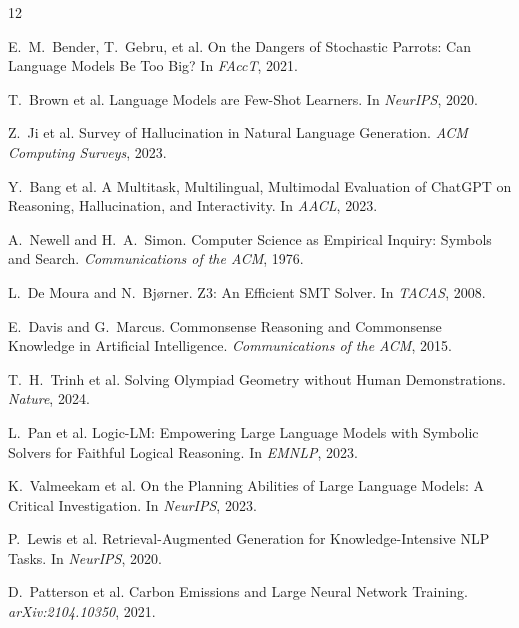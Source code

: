 \documentclass[11pt,a4paper]{article}
\begin{document}
\begin{thebibliography}{12}

E.~M.~Bender, T.~Gebru, et al.
\newblock On the Dangers of Stochastic Parrots: Can Language Models Be Too Big?
\newblock In \emph{FAccT}, 2021.

T.~Brown et al.
\newblock Language Models are Few-Shot Learners.
\newblock In \emph{NeurIPS}, 2020.

Z.~Ji et al.
\newblock Survey of Hallucination in Natural Language Generation.
\newblock \emph{ACM Computing Surveys}, 2023.

Y.~Bang et al.
\newblock A Multitask, Multilingual, Multimodal Evaluation of ChatGPT on Reasoning, Hallucination, and Interactivity.
\newblock In \emph{AACL}, 2023.

A.~Newell and H.~A.~Simon.
\newblock Computer Science as Empirical Inquiry: Symbols and Search.
\newblock \emph{Communications of the ACM}, 1976.

L.~De Moura and N.~Bj{\o}rner.
\newblock Z3: An Efficient SMT Solver.
\newblock In \emph{TACAS}, 2008.

E.~Davis and G.~Marcus.
\newblock Commonsense Reasoning and Commonsense Knowledge in Artificial Intelligence.
\newblock \emph{Communications of the ACM}, 2015.

T.~H.~Trinh et al.
\newblock Solving Olympiad Geometry without Human Demonstrations.
\newblock \emph{Nature}, 2024.

L.~Pan et al.
\newblock Logic-LM: Empowering Large Language Models with Symbolic Solvers for Faithful Logical Reasoning.
\newblock In \emph{EMNLP}, 2023.

K.~Valmeekam et al.
\newblock On the Planning Abilities of Large Language Models: A Critical Investigation.
\newblock In \emph{NeurIPS}, 2023.

P.~Lewis et al.
\newblock Retrieval-Augmented Generation for Knowledge-Intensive NLP Tasks.
\newblock In \emph{NeurIPS}, 2020.

D.~Patterson et al.
\newblock Carbon Emissions and Large Neural Network Training.
\newblock \emph{arXiv:2104.10350}, 2021.

\end{thebibliography}
\end{document}
